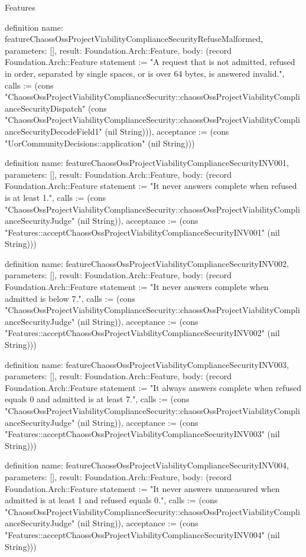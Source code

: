\begin{lexlean}{Features}
\begin{semanticmodule}
definition{
  name: featureChaossOssProjectViabilityComplianceSecurityRefuseMalformed,
  parameters: [],
  result: Foundation.Arch::Feature,
  body: (record Foundation.Arch::Feature {statement := "A request that is not admitted, refused in order, separated by single spaces, or is over 64 bytes, is answered invalid.", calls := (cons "ChaossOssProjectViabilityComplianceSecurity::chaossOssProjectViabilityComplianceSecurityDispatch" (cons "ChaossOssProjectViabilityComplianceSecurity::chaossOssProjectViabilityComplianceSecurityDecodeField1" (nil String))), acceptance := (cons "UorCommunityDecisions::application" (nil String))})
}

definition{
  name: featureChaossOssProjectViabilityComplianceSecurityINV001,
  parameters: [],
  result: Foundation.Arch::Feature,
  body: (record Foundation.Arch::Feature {statement := "It never answers complete when refused is at least 1.", calls := (cons "ChaossOssProjectViabilityComplianceSecurity::chaossOssProjectViabilityComplianceSecurityJudge" (nil String)), acceptance := (cons "Features::acceptChaossOssProjectViabilityComplianceSecurityINV001" (nil String))})
}

definition{
  name: featureChaossOssProjectViabilityComplianceSecurityINV002,
  parameters: [],
  result: Foundation.Arch::Feature,
  body: (record Foundation.Arch::Feature {statement := "It never answers complete when admitted is below 7.", calls := (cons "ChaossOssProjectViabilityComplianceSecurity::chaossOssProjectViabilityComplianceSecurityJudge" (nil String)), acceptance := (cons "Features::acceptChaossOssProjectViabilityComplianceSecurityINV002" (nil String))})
}

definition{
  name: featureChaossOssProjectViabilityComplianceSecurityINV003,
  parameters: [],
  result: Foundation.Arch::Feature,
  body: (record Foundation.Arch::Feature {statement := "It always answers complete when refused equals 0 and admitted is at least 7.", calls := (cons "ChaossOssProjectViabilityComplianceSecurity::chaossOssProjectViabilityComplianceSecurityJudge" (nil String)), acceptance := (cons "Features::acceptChaossOssProjectViabilityComplianceSecurityINV003" (nil String))})
}

definition{
  name: featureChaossOssProjectViabilityComplianceSecurityINV004,
  parameters: [],
  result: Foundation.Arch::Feature,
  body: (record Foundation.Arch::Feature {statement := "It never answers unmeasured when admitted is at least 1 and refused equals 0.", calls := (cons "ChaossOssProjectViabilityComplianceSecurity::chaossOssProjectViabilityComplianceSecurityJudge" (nil String)), acceptance := (cons "Features::acceptChaossOssProjectViabilityComplianceSecurityINV004" (nil String))})
}


\end{semanticmodule}
\end{lexlean}
